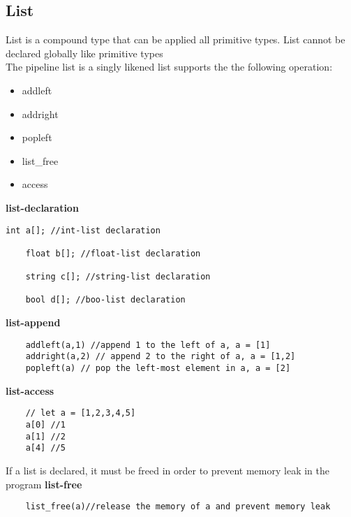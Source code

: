\documentclass[./Report_main.tex]{subfiles}
\begin{document}
\subsection{List}
List is a compound type that can be applied all primitive types. List cannot be declared globally like primitive types\\
The pipeline list is a singly likened list supports the the following operation:\\
\begin{itemize}
    \item addleft
    \item addright
    \item popleft
    \item list\_free
    \item access
\end{itemize}
\textbf{list-declaration}
\begin{lstlisting}[]
    int a[]; //int-list declaration
    
    float b[]; //float-list declaration
    
    string c[]; //string-list declaration
    
    bool d[]; //boo-list declaration
\end{lstlisting}
\textbf{list-append}
\begin{lstlisting}
    addleft(a,1) //append 1 to the left of a, a = [1]
    addright(a,2) // append 2 to the right of a, a = [1,2]
    popleft(a) // pop the left-most element in a, a = [2]
\end{lstlisting}
\textbf{list-access}
\begin{lstlisting}
    // let a = [1,2,3,4,5]
    a[0] //1
    a[1] //2
    a[4] //5
\end{lstlisting}
If a list is declared, it must be freed in order to prevent memory leak in the program
\textbf{list-free}
\begin{lstlisting}
    list_free(a)//release the memory of a and prevent memory leak
\end{lstlisting}
\end{document}
